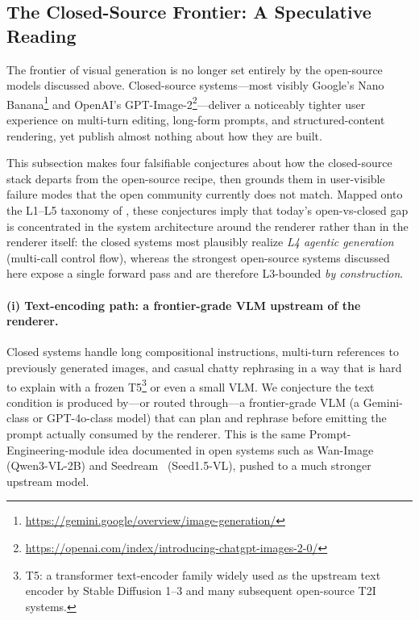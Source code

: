 \subsection{The Closed-Source Frontier: A Speculative Reading}
\label{sec:closed_source_frontier}

The frontier of visual generation is no longer set entirely by the open-source models discussed above. Closed-source systems---most visibly Google's Nano Banana\footnote{\url{https://gemini.google/overview/image-generation/}} and OpenAI's GPT-Image-2\footnote{\url{https://openai.com/index/introducing-chatgpt-images-2-0/}}---deliver a noticeably tighter user experience on multi-turn editing, long-form prompts, and structured-content rendering, yet publish almost nothing about how they are built.

This subsection makes four falsifiable conjectures about how the closed-source stack departs from the open-source recipe, then grounds them in user-visible failure modes that the open community currently does not match. Mapped onto the L1--L5 taxonomy of , these conjectures imply that today's open-vs-closed gap is concentrated in the system architecture around the renderer rather than in the renderer itself: the closed systems most plausibly realize \emph{L4 agentic generation} (multi-call control flow), whereas the strongest open-source systems discussed here expose a single forward pass and are therefore L3-bounded \emph{by construction}.

\paragraph{(i) Text-encoding path: a frontier-grade VLM upstream of the renderer.}
Closed systems handle long compositional instructions, multi-turn references to previously generated images, and casual chatty rephrasing in a way that is hard to explain with a frozen T5\footnote{T5: a transformer text-encoder family widely used as the upstream text encoder by Stable Diffusion 1--3 and many subsequent open-source T2I systems.} or even a small VLM. We conjecture the text condition is produced by---or routed through---a frontier-grade VLM (a Gemini-class or GPT-4o-class model) that can plan and rephrase before emitting the prompt actually consumed by the renderer. This is the same Prompt-Engineering-module idea documented in open systems such as Wan-Image~\citep{mao2026wan} (Qwen3-VL-2B) and Seedream~\citep{seedream2025seedream} (Seed1.5-VL), pushed to a much stronger upstream model.

